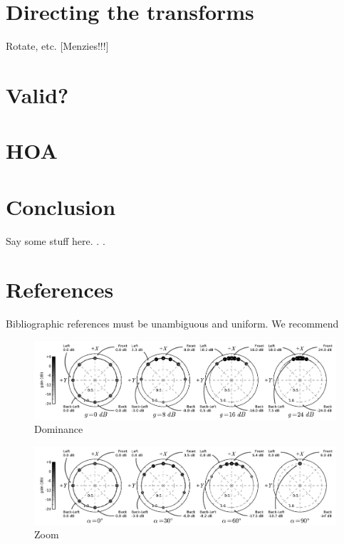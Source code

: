 \documentclass[12pt]{article}
\begin{document}
\section{Directing the transforms}

Rotate, etc. [Menzies!!!]

\section{Valid?}

\section{HOA}

\section{Conclusion}

Say some stuff here. . .

\section{References}

Bibliographic references must be unambiguous and uniform. We recommend



%


\begin{figure}
\centering
\includegraphics[width=1.\textwidth]{dominance_fig.pdf}
\caption{Dominance}
\label{fig:dominanceFig}
\end{figure}

\begin{figure}
\centering
\includegraphics[width=1.\textwidth]{zoom_fig.pdf}
\caption{Zoom}
\label{fig:zoomFig}
\end{figure}
\end{document}
